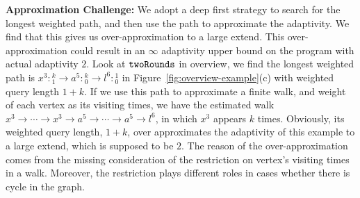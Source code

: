  \textbf{Approximation Challenge:}
  We adopt a deep first strategy to search for the longest weighted path, and then use the path to approximate the adaptivity. We find that this gives us over-approximation to a large extend.
 This over-approximation could result in an $\infty$ adaptivity upper bound on the program with actual adaptivity $2$.
 Look at $\mathtt{twoRounds}$ in overview, 
 we find the longest weighted path is  $x^3 : {}^{k}_{1} \to a^5 : {}^{k}_{0} \to l^6 : {}^{1}_{0}$ in Figure~\ref{fig:overview-example}(c)  with weighted query length $1 + k$.
 If we use this path to approximate a finite walk, and weight of each vertex as
 its visiting times,
 we have the estimated walk $x^3 \to \cdots \to x^3 \to a^5 \to \cdots \to a^5 \to l^6$, in which $x^3$ appears $k$ times. 
 Obviously,
 its weighted query length, $1 + k$, 
 over approximates 
 the adaptivity of this example to a large extend, which is supposed to be $2$. 
 The reason of the over-approximation comes from the missing consideration of the restriction on vertex's visiting times in a walk.
 Moreover, the restriction plays different roles in cases
 whether there is cycle in the graph.
